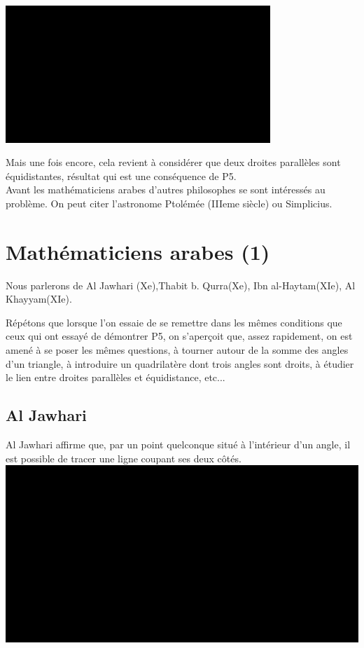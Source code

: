 \documentclass[a4paper, 12pt, twoside]{book}
\begin{document}
\includegraphics[width=10cm]{figures/proclus.eps} \

   Mais une fois encore, cela revient à considérer que deux droites parallèles sont équidistantes, résultat qui est une conséquence de P5.\\
   

  Avant les mathématiciens arabes  d'autres philosophes se sont intéressés au problème. On peut citer l'astronome Ptolémée (IIIeme siècle) ou Simplicius.  
    
  
  \section{Mathématiciens arabes (1)}
  
   Nous parlerons de Al Jawhari (Xe),Thabit b. Qurra(Xe), Ibn al-Haytam(XIe), Al Khayyam(XIe).\bigskip 
   
   Répétons que lorsque l'on essaie de se remettre dans les mêmes conditions que ceux qui ont essayé de démontrer P5, on s'aperçoit que, assez rapidement, on est amené à se poser les mêmes questions, à tourner autour de la somme des angles d'un triangle, à introduire un quadrilatère dont trois angles sont droits, à étudier le lien entre droites parallèles et équidistance, etc... 
   
   \subsection{Al Jawhari}
   
  Al Jawhari affirme que, par un point quelconque situé à l'intérieur d'un angle, il est possible de tracer une ligne coupant ses deux côtés. \\
  
  
  \includegraphics[scale=0.7]{figures/ALJAHW2.eps} 
  
\end{document}
